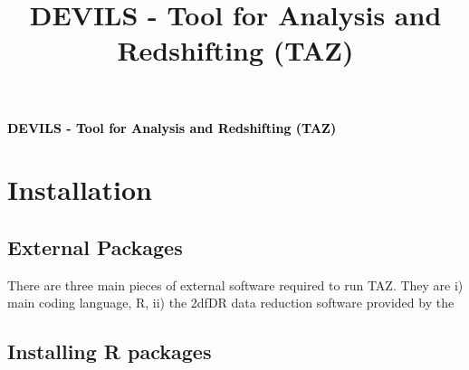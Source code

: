 \documentclass[12pt]{article}
\begin{document}
\title{DEVILS - Tool for Analysis and Redshifting (TAZ) }

\begin{center}
\Large {\textcolor{black}{\textbf{DEVILS - Tool for Analysis and Redshifting (TAZ)}}}
\end{center}
\normalsize


\section{Installation}

\subsection{External Packages}

There are three main pieces of external software required to run TAZ. They are i) main coding language, R, ii) the 2dfDR data reduction software provided by the 


\subsection{Installing R packages}
\end{document}
